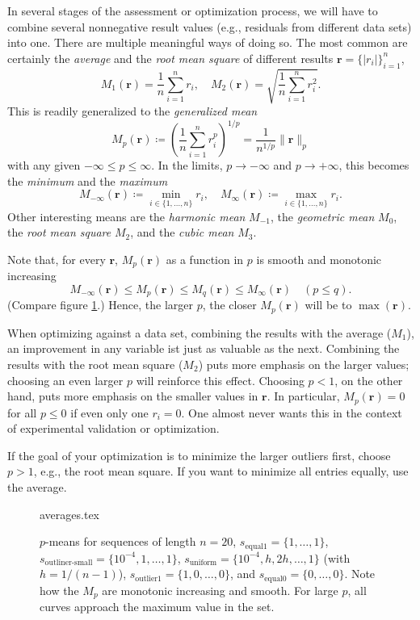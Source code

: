 \documentclass{scrartcl}
\theoremstyle{named}
\newcommand\rr{\ensuremath{\bm{r}}}
\begin{document}
In several stages of the assessment or optimization process, we will have to combine
several nonnegative result values (e.g., residuals from different data sets) into one.
There are multiple meaningful ways of doing so. The most common are certainly the
\emph{average} and the \emph{root mean square} of different results
$\rr = \{|r_i|\}_{i=1}^n$,
\[
  M_1(\rr) = \frac{1}{n}\sum_{i=1}^n r_i,\quad
  M_2(\rr) = \sqrt{\frac{1}{n}\sum_{i=1}^n r_i^2}.
\]
This is readily generalized to the
\emph{generalized mean}
\[
  M_p(\rr) \coloneqq \left(\frac{1}{n}\sum_{i=1}^n r_i^p\right)^{1/p} =
  \frac{1}{n^{1/p}} \|\rr\|_p
\]
with any given $-\infty \le p \le \infty$. In the limits, $p\to-\infty$ and
$p\to +\infty$, this becomes the \emph{minimum} and the \emph{maximum}
\[
  M_{-\infty}(\rr) \coloneqq \min_{i\in\{1,\dots,n\}} r_i, \quad
  M_{\infty}(\rr) \coloneqq \max_{i\in\{1,\dots,n\}} r_i.
\]
Other interesting means are the \emph{harmonic mean} $M_{-1}$, the \emph{geometric mean}
$M_0$, the \emph{root mean square} $M_2$, and the \emph{cubic mean} $M_3$.

Note that, for every $\rr$, $M_p(\rr)$ as a function in $p$ is smooth and monotonic
increasing
\[
  M_{-\infty}(\rr) \le M_p(\rr) \le M_q(\rr) \le M_{\infty}(\rr) \quad (p\le q).
\]
(Compare figure \ref{fig:1}.)
Hence, the larger $p$, the closer $M_p(\rr)$ will be to $\max(\rr)$.

When optimizing against a data set, combining the results with the average ($M_1$), an
improvement in any variable ist just as valuable as the next. Combining the results with
the root mean square ($M_2$) puts more emphasis on the larger values; choosing an even
larger $p$ will reinforce this effect. Choosing $p < 1$, on the other hand, puts more
emphasis on the smaller values in $\rr$.  In particular, $M_p(\rr)=0$ for all $p\le 0$
if even only one $r_i=0$. One almost never wants this in the context of experimental
validation or optimization.

If the goal of your optimization is to minimize the larger outliers first, choose $p>1$,
e.g., the root mean square. If you want to minimize all entries equally, use the
average.

\begin{figure}
  \centering
  {averages.tex}
  \caption{$p$-means for sequences of length $n=20$, $s_\text{equal1} = \{1, \dots,
  1\}$, $s_\text{outliner-small} = \{10^{-4}, 1,\dots, 1\}$, $s_\text{uniform} =
  \{10^{-4}, h, 2h, \dots, 1\}$ (with $h = 1 / (n-1)$), $s_\text{outlier1} = \{1,
  0,\dots, 0\}$, and $s_\text{equal0} = \{0,\dots,0\}$. Note how the $M_p$ are monotonic
  increasing and smooth. For large $p$, all curves approach the maximum value in the
  set.}
  \label{fig:1}
\end{figure}
\end{document}
